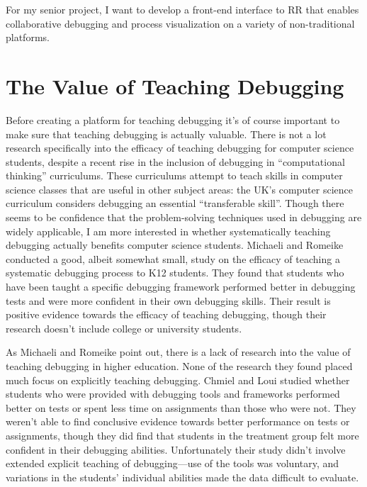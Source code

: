 \documentclass[12pt]{article}
\begin{document}
For my senior project, I want to develop a front-end interface to RR
that enables collaborative debugging and process visualization on a
variety of non-traditional platforms.

\section{The Value of Teaching Debugging}

Before creating a platform for teaching debugging it's of course
important to make sure that teaching debugging is actually valuable.
There is not a lot research specifically into the efficacy of teaching
debugging for computer science students, despite a recent rise in the
inclusion of debugging in ``computational thinking''
curriculums\cite{10.1145/3361721.3361724}.  These curriculums attempt
to teach skills in computer science classes that are useful in other
subject areas: the UK's computer science curriculum considers
debugging an essential ``transferable skill''\cite{10.1145/2602484}.
Though there seems to be confidence that the problem-solving
techniques used in debugging are widely applicable, I am more
interested in whether systematically teaching debugging actually
benefits computer science students.  Michaeli and Romeike conducted a
good, albeit somewhat small, study on the efficacy of teaching a
systematic debugging process to K12 students.  They found that
students who have been taught a specific debugging framework performed
better in debugging tests and were more confident in their own
debugging skills\cite{10.1145/3361721.3361724}.  Their result is
positive evidence towards the efficacy of teaching debugging, though
their research doesn't include college or university students.\par

As Michaeli and Romeike point out, there is a lack of research into
the value of teaching debugging in higher education.  None of the
research they found placed much focus on explicitly teaching
debugging.  Chmiel and Loui studied whether students who were provided
with debugging tools and frameworks performed better on tests or spent
less time on assignments than those who were
not\cite{10.1145/971300.971310}.  They weren't able to find conclusive
evidence towards better performance on tests or assignments, though
they did find that students in the treatment group felt more confident
in their debugging abilities.  Unfortunately their study didn't
involve extended explicit teaching of debugging---use of the tools was
voluntary, and variations in the students' individual abilities made
the data difficult to evaluate.\par
\end{document}

